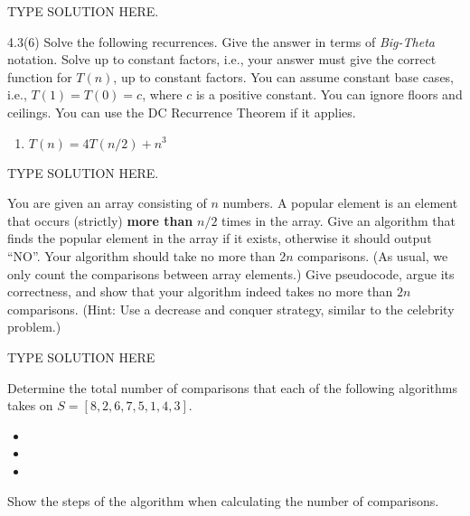 \documentclass[final]{article}
\begin{document}
\begin{solution}
    TYPE SOLUTION HERE.
\end{solution}

\begin{exercise}{4.3(6)}
    Solve the following recurrences. Give the answer in terms of \emph{Big-Theta} notation.  Solve up to constant
    factors, i.e., your answer must give the correct function for $T(n)$, up to constant factors.
    You can  assume constant base cases, i.e., $T(1) = T(0) = c$, where $c$ is a positive constant.
    You can ignore floors and ceilings. You can use the DC Recurrence Theorem if it applies.
    \begin{enumerate}[start=6, label=\arabic*.]
        \item $T(n) = 4 T(n/2) + n^3$
    \end{enumerate}
\end{exercise}

\begin{solution}
    TYPE SOLUTION HERE.
\end{solution}

\begin{exercise}{4.4}
    You are given an array consisting of $n$ numbers. A popular element is an element
    that occurs (strictly) \textbf{more than} $n/2$ times in the array. Give an algorithm that finds
    the popular element in the array if it exists, otherwise it should output ``NO''. Your algorithm should take no more than $2n$ comparisons. (As usual, we only count the comparisons between array elements.)
    Give pseudocode, argue its correctness, and show that your algorithm indeed takes no more than $2n$ comparisons.
    (Hint: Use a decrease and conquer strategy, similar to the celebrity problem.)
\end{exercise}

\begin{solution}
    TYPE SOLUTION HERE
\end{solution}

\begin{exercise}{5.1}
    Determine the total number of comparisons that each of the following algorithms takes on $S = [8, 2, 6, 7, 5, 1, 4, 3]$.
    \begin{itemize}[nosep]
        \item {}
        \item {}
        \item {}
    \end{itemize}
    Show the steps of the algorithm when calculating the number of comparisons.
\end{exercise}
\end{document}
